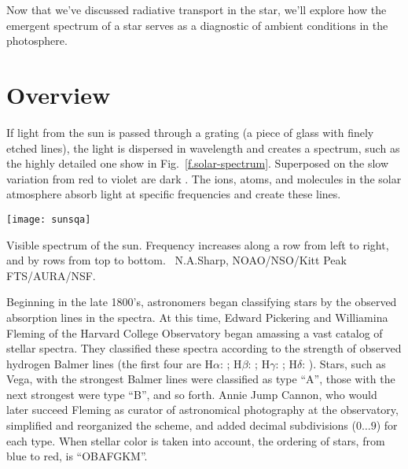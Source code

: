 
\nocite{Mihalas1978Stellar-Atmosph,LeBlanc2010An-Introduction,Carroll2006An-Introduction}

Now that we've discussed radiative transport in the star, we'll explore how the emergent spectrum of a star serves as a diagnostic of ambient conditions in the photosphere.

\section{Overview}

If light from the sun is passed through a grating (a piece of glass with finely etched lines), the light is dispersed in wavelength and creates a spectrum, such as the highly detailed one show in Fig.~\ref{f.solar-spectrum}. Superposed on the slow variation from red to violet are dark . The ions, atoms, and molecules in the solar atmosphere absorb light at specific frequencies and create these lines.
\begin{marginfigure}
\texttt{[image: sunsqa]}
\caption[Visible spectrum of the sun]{\label{f.solar-spectrum} Visible spectrum of the sun. Frequency increases along a row from left to right, and by rows from top to bottom. \imgcred\ 
N.A.Sharp, NOAO/NSO/Kitt Peak FTS/AURA/NSF.}
\end{marginfigure}

Beginning in the late 1800's, astronomers began classifying stars by the observed absorption lines in the spectra. At this time, Edward Pickering and Williamina Fleming of the Harvard College Observatory began amassing a vast catalog of stellar spectra. They classified these spectra according to the strength of observed hydrogen Balmer lines (the first four are H$\alpha$: ; H$\beta$: ; H$\gamma$: ; H$\delta$: ). Stars, such as Vega, with the strongest Balmer lines were classified as type ``A'', those with the next strongest were type ``B'', and so forth. Annie Jump Cannon, who would later succeed Fleming as curator of astronomical photography at the observatory, simplified and reorganized the scheme, and added decimal subdivisions ($0\ldots9$) for each type. When stellar color is taken into account, the ordering of stars, from blue to red, is ``OBAFGKM''. 

